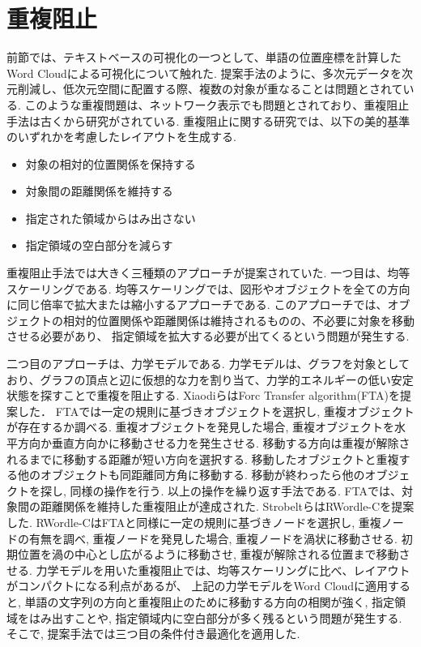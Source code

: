 \documentclass[syuuron]{kuee}
\begin{document}
	\section{重複阻止}
		前節では、テキストベースの可視化の一つとして、単語の位置座標を計算したWord Cloudによる可視化について触れた. 
		提案手法のように、多次元データを次元削減し、低次元空間に配置する際、複数の対象が重なることは問題とされている. 
		このような重複問題は、ネットワーク表示でも問題とされており、重複阻止手法は古くから研究がされている. 
		重複阻止に関する研究では、以下の美的基準のいずれかを考慮したレイアウトを生成する. 
		\begin{itemize}
			\item 対象の相対的位置関係を保持する
			\item 対象間の距離関係を維持する
			\item 指定された領域からはみ出さない
			\item 指定領域の空白部分を減らす
		\end{itemize}
		
		重複阻止手法では大きく三種類のアプローチが提案されていた. 
		一つ目は、均等スケーリングである. 均等スケーリングでは、図形やオブジェクトを全ての方向に同じ倍率で拡大または縮小するアプローチである. 
		このアプローチでは、オブジェクトの相対的位置関係や距離関係は維持されるものの、不必要に対象を移動させる必要があり、
		指定領域を拡大する必要が出てくるという問題が発生する. 
		
		二つ目のアプローチは、力学モデルである. 
		力学モデルは、グラフを対象としており、グラフの頂点と辺に仮想的な力を割り当て、力学的エネルギーの低い安定状態を探すことで重複を阻止する. 
		XiaodiらはForc
		Transfer algorithm(FTA)を提案した\cite{fta1}．
		FTAでは一定の規則に基づきオブジェクトを選択し, 重複オブジェクトが存在するか調べる. 
		重複オブジェクトを発見した場合, 重複オブジェクトを水平方向か垂直方向かに移動させる力を発生させる. 
		移動する方向は重複が解除されるまでに移動する距離が短い方向を選択する. 移動したオブジェクトと重複する他のオブジェクトも同距離同方角に移動する. 
		移動が終わったら他のオブジェクトを探し, 同様の操作を行う. 以上の操作を繰り返す手法である. 
		FTAでは、対象間の距離関係を維持した重複阻止が達成された. 
		StrobeltらはRWordle-Cを提案した\cite{rwc1}. 
		RWordle-CはFTAと同様に一定の規則に基づきノードを選択し, 重複ノードの有無を調べ, 
		重複ノードを発見した場合, 重複ノードを渦状に移動させる. 初期位置を渦の中心とし広がるように移動させ, 重複が解除される位置まで移動させる. 
		力学モデルを用いた重複阻止では、均等スケーリングに比べ、レイアウトがコンパクトになる利点があるが、
		上記の力学モデルをWord Cloudに適用すると, 単語の文字列の方向と重複阻止のために移動する方向の相関が強く, 
		指定領域をはみ出すことや, 指定領域内に空白部分が多く残るという問題が発生する. 
		そこで, 提案手法では三つ目の条件付き最適化を適用した. 
		
\end{document}
